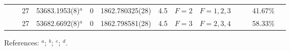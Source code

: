 \begin{table*}
\begin{center}
{\begin{tabular}{:l;l;c;l;c;l;c;l;l;c;c;c;c}
\rowstyle{\itshape}               &        & 27        & 53683.1953(8)$^{a}$              & 0 &   1862.780325(28)  &  4.5 & $F=2                                     $ & $F=1,2,3                                 $ & $      $ &              & 41.67\%   & $     ^{}     $\\
\rowstyle{\itshape}               &        & 27        & 53682.6692(8)$^{a}$              & 0 &   1862.798581(28)  &  4.5 & $F=3                                     $ & $F=2,3,4                                 $ & $      $ &              & 58.33\%   & $     ^{}     $\\
\hline
\end{tabular}
}
{\footnotesize References:
$^{a}$\citet{Griesmann:2000:L113};
$^{b}$\citet{Angstmann:2004:014102};
$^{c}$\citet{Savukov:2008:042501};
$^{d}$\citet{Dzuba:2007:062510}.}
\end{center}
\end{table*}

